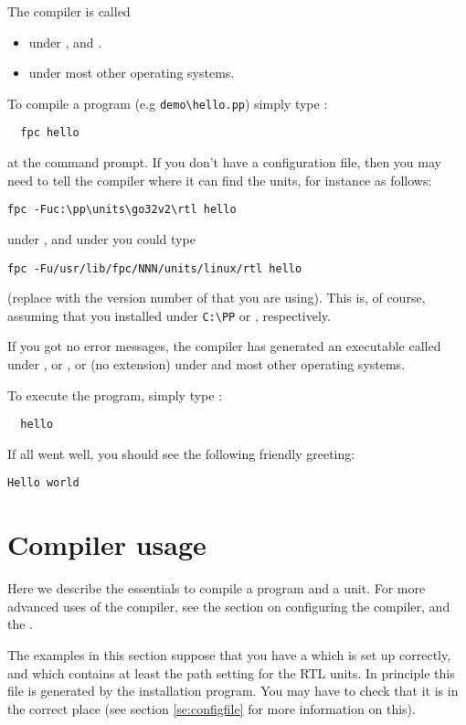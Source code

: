 The compiler is called
\begin{itemize}
\item {} under \windows, \ostwo and \dos.
\item {} under most other operating systems.
\end{itemize}
To compile a program (e.g \verb|demo\hello.pp|) simply type :
\begin{verbatim}
  fpc hello
\end{verbatim}
at the command prompt. If you don't have a configuration file, then you may
need to tell the compiler where it can find the units, for instance as
follows:
\begin{verbatim}
fpc -Fuc:\pp\units\go32v2\rtl hello
\end{verbatim}
under \dos, and under \linux you could type
\begin{verbatim}
fpc -Fu/usr/lib/fpc/NNN/units/linux/rtl hello
\end{verbatim}
(replace  with the version number of \fpc that you are using).
This is, of course, assuming that you installed under \verb|C:\PP| or
, respectively.

If you got no error messages, the compiler has generated an executable
called  under \dos, \ostwo or \windows, or  
(no extension) under \unix and most other operating systems.

To execute the program, simply type :
\begin{verbatim}
  hello
\end{verbatim}
If all went well, you should see the following friendly greeting:
\begin{verbatim}
Hello world
\end{verbatim}

\chapter{Compiler usage}
\label{ch:Usage}

Here we describe the essentials to compile a program and a unit.
For more advanced uses of the compiler, see the section on configuring 
the compiler, and the \progref{}.

The examples in this section suppose that you have a  which
is set up correctly, and which contains at least the path setting for the
RTL units. In principle this file is generated by the installation program.
You may have to check that it is in the correct place (see section
\ref{se:configfile} for more information on this).

